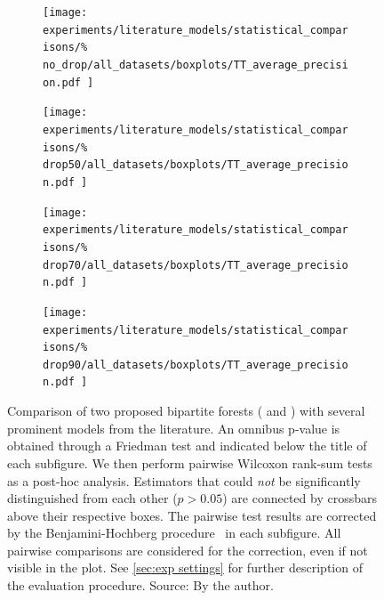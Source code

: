 \begin{figure}[tb]
    \begin{subfigure}{0.24\textwidth}
        \texttt{[image: 
            experiments/literature\_models/statistical\_comparisons/\%
            no\_drop/all\_datasets/boxplots/TT\_average\_precision.pdf
        ]}
    \end{subfigure}
    \begin{subfigure}{0.24\textwidth}
        \texttt{[image: 
            experiments/literature\_models/statistical\_comparisons/\%
            drop50/all\_datasets/boxplots/TT\_average\_precision.pdf
        ]}
    \end{subfigure}
    \begin{subfigure}{0.24\textwidth}
        \texttt{[image: 
            experiments/literature\_models/statistical\_comparisons/\%
            drop70/all\_datasets/boxplots/TT\_average\_precision.pdf
        ]}
    \end{subfigure}
    \begin{subfigure}{0.24\textwidth}
        \texttt{[image: 
            experiments/literature\_models/statistical\_comparisons/\%
            drop90/all\_datasets/boxplots/TT\_average\_precision.pdf
        ]}
    \end{subfigure}
    \caption{
        Comparison of two proposed bipartite forests ( and ) with several prominent models from the literature.
        An omnibus p-value is obtained through a Friedman test and indicated below the title of each subfigure.
        We then perform pairwise Wilcoxon rank-sum tests as a post-hoc analysis.
        Estimators that could \emph{not} be significantly distinguished from each other ($p > 0.05$) are connected by crossbars above their respective boxes. 
        The pairwise test results are corrected by the Benjamini-Hochberg procedure~\cite{benjamini1995controlling,haynes2013benjamini} in each subfigure. All pairwise comparisons are considered for the correction, even if not visible in the plot.
        See \autoref{sec:exp settings} for further description of the evaluation procedure. \newline Source: By the author.
    }
    \label{fig:comparison literature}
\end{figure}


